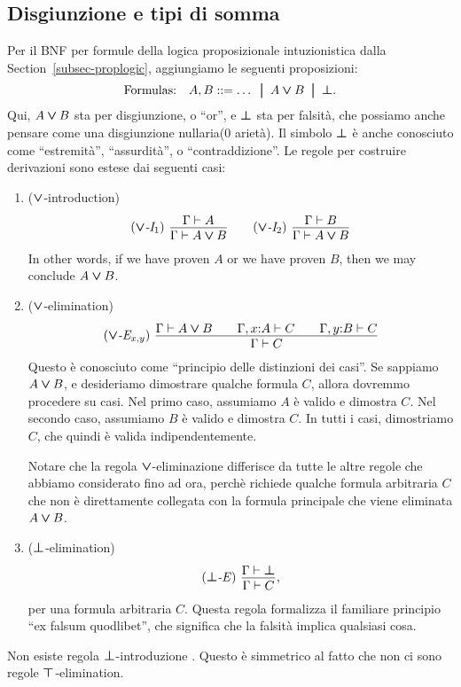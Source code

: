 \documentclass{article}
\begin{document}
\subsection{Disgiunzione e tipi di somma}

Per il BNF per formule della logica proposizionale intuzionistica dalla
Section~\ref{subsec-proplogic}, aggiungiamo le seguenti proposizioni:
\[ \mbox{Formulas:}\ssep A,B \bnf \ldots \bor A\cor B \bor \cfalse.
\]
Qui, $A\mathbin{\textrm{\rm\boldmath $\vee$}} B$ sta per disgiunzione, o ``or'', e $\textrm{\rm\boldmath $\bot$}$
sta per falsit\`a, che possiamo anche pensare come una disgiunzione 
nullaria(0 ariet\`a). Il simbolo $\textrm{\rm\boldmath $\bot$}$ è anche conosciuto come
``estremit\`a'', ``assurdit\`a'', o ``contraddizione''.  Le regole per
 costruire derivazioni sono estese dai seguenti casi:
\begin{enumerate}
\resumeenumerate
\item ($\mathbin{\textrm{\rm\boldmath $\vee$}}$-introduction)
\[ \trule{$\cor$-I$_1$}\ \deriv{\Gamma\tj A}{\Gamma\tj A\cor B}
\sep
\trule{$\cor$-I$_2$}\ \deriv{\Gamma\tj B}{\Gamma\tj A\cor B}
\]
In other words, if we have proven $A$ or we have proven $B$, then we
may conclude $A\mathbin{\textrm{\rm\boldmath $\vee$}} B$.
\item ($\mathbin{\textrm{\rm\boldmath $\vee$}}$-elimination)
\[ \trule{$\cor$-E$_{x,y}$}\ \deriv{\Gamma\tj A\cor B
  \sep \Gamma,\typ{x}{A}\tj C
  \sep \Gamma,\typ{y}{B}\tj C}{\Gamma\tj C}
\]
Questo \`e conosciuto come ``principio delle distinzioni dei casi''. Se sappiamo
$A\mathbin{\textrm{\rm\boldmath $\vee$}} B$, e desideriamo dimostrare qualche formula $C$, allora dovremmo procedere
su casi. Nel primo caso, assumiamo $A$ \`e valido e dimostra $C$. Nel
secondo caso, assumiamo $B$ \`e valido e dimostra $C$. In tutti i casi, 
dimostriamo $C$, che quindi è valida indipendentemente. 

Notare che la regola $\mathbin{\textrm{\rm\boldmath $\vee$}}$-eliminazione differisce da tutte le altre regole che
abbiamo considerato fino ad ora, perch\`e richiede qualche formula arbitraria $C$
che non \`e direttamente collegata con la formula principale che viene eliminata $A\mathbin{\textrm{\rm\boldmath $\vee$}} B$.
\item ($\textrm{\rm\boldmath $\bot$}$-elimination)
\[ \trule{$\cfalse$-E}\ \deriv{\Gamma\tj\cfalse}{\Gamma\tj C},
\]
per una formula arbitraria $C$. Questa regola formalizza il familiare
principio ``ex falsum quodlibet'', che significa che la falsità 
implica qualsiasi cosa.
\end{enumerate}

Non esiste regola $\textrm{\rm\boldmath $\bot$}$-introduzione . Questo \`e simmetrico al fatto 
che non ci sono regole $\textrm{\rm\boldmath $\top$}$-elimination.
\end{document}
